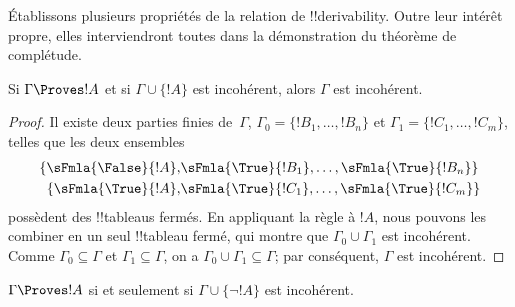 \documentclass[../../../include/open-logic-section]{subfiles}
\begin{document}
      {}
      {}


Établissons plusieurs propriétés de la relation de !!{derivability}.
Outre leur intérêt propre, elles interviendront toutes dans la démonstration du théorème de complétude.

\begin{prop}
  Si $\Gamma \Proves !A$ et si $\Gamma \cup \{!A\}$ est
  incohérent, alors $\Gamma$ est incohérent.
\end{prop}

\begin{proof}
Il existe deux parties finies de~$\Gamma$,
$\Gamma_0 = \{!B_1, \dots, !B_n\}$ et
$\Gamma_1 = \{!C_1, \dots, !C_m\}$, telles que les deux ensembles
  \begin{align*}
    \{\sFmla{\False}{!A}, &
    \sFmla{\True}{!B_1}, \dots, \sFmla{\True}{!B_n}\} \\
    \{\sFmla{\True}{!A}, &
    \sFmla{\True}{!C_1}, \dots, \sFmla{\True}{!C_m}\}
  \end{align*}
possèdent des !!{tableau}s fermés. En appliquant la règle \Cut{} à
$!A$, nous pouvons les combiner en un seul !!{tableau} fermé, qui
montre que $\Gamma_0 \cup \Gamma_1$ est incohérent. Comme
$\Gamma_0 \subseteq \Gamma$ et $\Gamma_1 \subseteq \Gamma$, on a
$\Gamma_0 \cup \Gamma_1 \subseteq \Gamma$; par conséquent,
$\Gamma$ est incohérent.
\end{proof}

%
%
%
%
%

\begin{prop}
$\Gamma \Proves !A$ si et seulement si
$\Gamma \cup \{\lnot !A\}$ est incohérent.
\end{prop}
\end{document}
